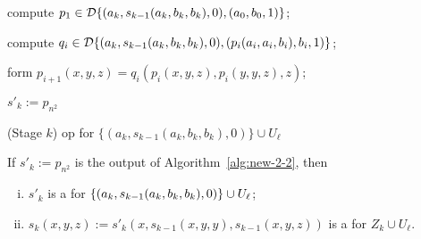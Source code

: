 \begin{algorithm}  
  
  compute $p_1 \in \mathcal{D} \{(a_k, s_{k-1}(a_k,b_k,b_k), 0), (a_0, b_0, 1)\}$;
  
   {
    compute $q_i\in \mathcal{D} \{(a_k, s_{k-1}(a_k,b_k,b_k), 0), (p_i(a_i, a_i, b_i), b_i, 1)\}$;
  
    form $p_{i+1}(x,y,z) = q_i(p_i(x,y,z), p_i(y,y,z), z)$;
  }
  
  \Return $s'_k := p_{n^2}$
  \caption{(Stage $k$) \ldt op for $\{(a_k, s_{k-1}(a_k, b_k, b_k), 0)\} \cup U_{\ell}$\label{alg:new-2-2}}
\end{algorithm}

\begin{lemma}
  \label{lem:20}
  If $s'_k:=p_{n^2}$ is the output of Algorithm~\ref{alg:new-2-2}, then 
  \begin{enumerate}[i.]
    \item \label{item:1}
    $s'_k$ is a \ldto for $\{(a_k, s_{k-1}(a_k, b_k, b_k), 0)\} \cup U_{\ell}$;
    \item \label{item:2}
    $s_k(x,y,z):= s'_k(x,s_{k-1}(x,y,y),s_{k-1}(x,y,z))$ is a \ldto for $Z_k \cup U_{\ell}$.
  \end{enumerate}
  \end{lemma}
